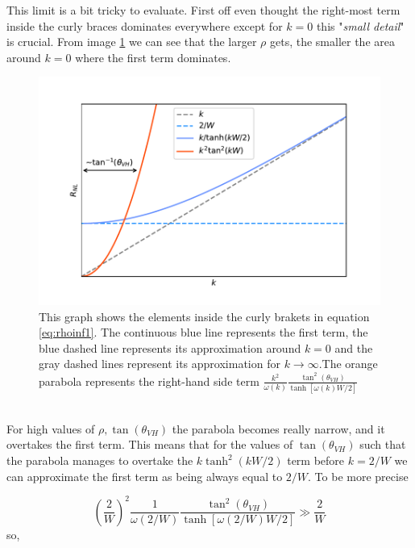 This limit is a bit tricky to evaluate. First off even thought the right-most term inside the curly braces dominates everywhere except for $k=0$ this "\emph{small detail}" is crucial. From image \ref{fig:rho1} we can see that the larger $\rho$ gets, the smaller the area around $k=0$ where the first term dominates.
\begin{figure}[h!]
    \centering
    \includegraphics[width=\linewidth]{Immagini/rnl/rho1.pdf}
    \caption{This graph shows the elements inside the curly brakets in equation \ref{eq:rhoinf1}. The continuous blue line represents the first term, the blue dashed line represents its approximation around $k=0$ and the gray dashed lines represent its approximation for $k\to \infty$.\newline The orange parabola represents the right-hand side term $\frac {k^2}{\omega(k)}\frac{\tan^2(\theta_{VH})}{\tanh[\omega(k)W/2]}$}
    \label{fig:rho1}
\end{figure}\\
For high values of $\rho, \tan(\theta_{VH})$ the parabola becomes really narrow, and it overtakes the first term. This means that for the values of $\tan(\theta_{VH})$ such that the parabola manages to overtake the $k\tanh^2(kW/2)$ term before $k=2/W$ we can approximate the first term as being always equal to $2/W$. To be more precise

\[
    \left(\frac 2W\right)^2\frac 1{\omega(2/W)}\frac{\tan^2(\theta_{VH})}{\tanh[\omega(2/W)W/2]}\gg \frac 2W
\]
so,

